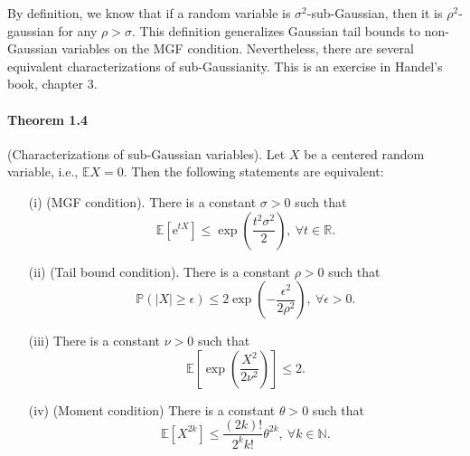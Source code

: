 \documentclass{article}
\newcommand{\E}{\mathbb{E}}
\begin{document}
By definition, we know that if a random variable is $\sigma^2$-sub-Gaussian, then it is $\rho^2$-gaussian for any $\rho > \sigma.$ This definition generalizes Gaussian tail bounds to non-Gaussian variables on the MGF condition. Nevertheless, there are several equivalent characterizations of sub-Gaussianity. This is an exercise in Handel's book, chapter 3.

\paragraph{Theorem 1.4} (Characterizations of sub-Gaussian variables). Let $X$ be a centered random variable, i.e., $\E X=0$. Then the following statements are equivalent:
\begin{itemize}
\item[(i)] (MGF condition). There is a constant $\sigma >0$ such that
\begin{equation*}
	\E[\mathrm{e}^{tX}] \leq \exp\left(\frac{t^2\sigma^2}{2}\right),\ \forall t\in\mathbb{R}.\tag{1.8}
\end{equation*}
\item[(ii)] (Tail bound condition). There is a constant $\rho>0$ such that
\begin{equation*}
	\mathbb{P}(\vert X\vert \geq \epsilon)\leq 2\exp\left(-\frac{\epsilon^2}{2\rho^2}\right),\ \forall \epsilon > 0.\tag{1.9}
\end{equation*}
\item[(iii)] There is a constant $\nu > 0$ such that
\begin{equation*}
	\E\left[\exp\left(\frac{X^2}{2\nu^2}\right)\right]\leq 2.\tag{1.10}
\end{equation*}
\item[(iv)] (Moment condition) There is a constant $\theta > 0$ such that
\begin{equation*}
	\E[X^{2k}] \leq \frac{(2k)!}{2^k k!}\theta^{2k},\ \forall k\in\mathbb{N}.\tag{1.11}
\end{equation*}
\end{itemize}
\end{document}
